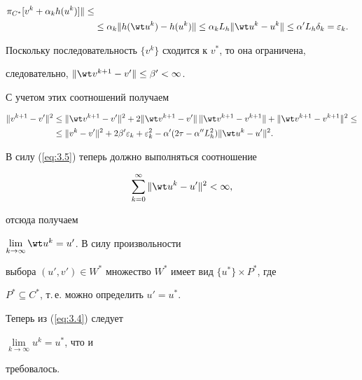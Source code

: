 \begin{pf}
\begin{align*}
\pi_{C^*} [v^{k}+\alpha_{k} h(u^{k} )] \|\le \\


%


&\leq \alpha_k\|h(\wt u^{k})-h(u^{k})\|\leq\alpha_k L_{h}\|\wt u^k-u^{k} \|


\leq \alpha' L_{h} \delta_{k}=\varepsilon_{k}. 


\end{align*}


Поскольку последовательность $\{v^{k} \}$ сходится к $v^*$, то она ограничена, 


следовательно, $\| \wt v^{k+1} - v' \| \leq \beta' < \infty$.


С учетом этих соотношений получаем


\begin{align*}


\| v^{k+1} - v' \|^2 &\leq \| \wt v^{k+1} - v' \|^2+


2 \| \wt v^{k+1} - v' \|\, \| \wt v^{k+1} - v^{k+1} \|+


\| \wt v^{k+1} - v^{k+1} \|^2 \le \\


%


&\leq \| v^{k} - v' \|^2+2\beta' \varepsilon_{k}+\varepsilon^2_{k} -


\alpha' (2 \tau - \alpha'' L^2_{h} ) \| \wt u^{k} - u' \|^2. 


\end{align*}


В силу (\ref{eq:3.5}) теперь должно выполняться соотношение


$$


\sum_{k=0}^{\infty} \| \wt u^{k} - u' \|^2 < \infty , 


$$


отсюда получаем


$\lim\limits_{k \rightarrow \infty} \wt u^{k}=u'$. В силу произвольности 


выбора $(u',v')\in W^*$ множество $W^*$ имеет вид $\{u^* \}\times P^*$, где 


$P^* \subseteq C^*$, т.\,е. можно определить $u'=u^*$. 


Теперь из (\ref{eq:3.4}) следует


$\lim\limits_{k \rightarrow \infty} u^{k}=u^* $, что и 


требовалось.


\end{pf}


 


